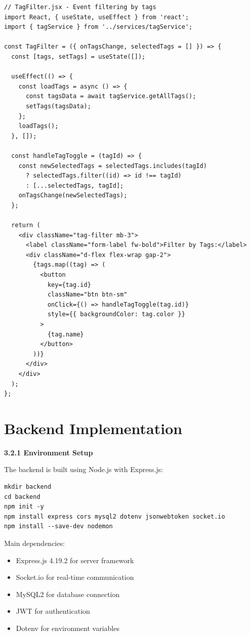 \documentclass[12pt]{report}
\begin{document}
\begin{lstlisting}
// TagFilter.jsx - Event filtering by tags
import React, { useState, useEffect } from 'react';
import { tagService } from '../services/tagService';

const TagFilter = ({ onTagsChange, selectedTags = [] }) => {
  const [tags, setTags] = useState([]);

  useEffect(() => {
    const loadTags = async () => {
      const tagsData = await tagService.getAllTags();
      setTags(tagsData);
    };
    loadTags();
  }, []);

  const handleTagToggle = (tagId) => {
    const newSelectedTags = selectedTags.includes(tagId)
      ? selectedTags.filter((id) => id !== tagId)
      : [...selectedTags, tagId];
    onTagsChange(newSelectedTags);
  };

  return (
    <div className="tag-filter mb-3">
      <label className="form-label fw-bold">Filter by Tags:</label>
      <div className="d-flex flex-wrap gap-2">
        {tags.map((tag) => (
          <button
            key={tag.id}
            className="btn btn-sm"
            onClick={() => handleTagToggle(tag.id)}
            style={{ backgroundColor: tag.color }}
          >
            {tag.name}
          </button>
        ))}
      </div>
    </div>
  );
};
\end{lstlisting}

\section{Backend Implementation} 

\textbf{3.2.1 Environment Setup}

The backend is built using Node.js with Express.js:

\begin{lstlisting}
mkdir backend
cd backend
npm init -y
npm install express cors mysql2 dotenv jsonwebtoken socket.io
npm install --save-dev nodemon
\end{lstlisting}

Main dependencies:
\begin{itemize}
\item Express.js 4.19.2 for server framework
\item Socket.io for real-time communication
\item MySQL2 for database connection
\item JWT for authentication
\item Dotenv for environment variables
\end{itemize}
\end{document}
